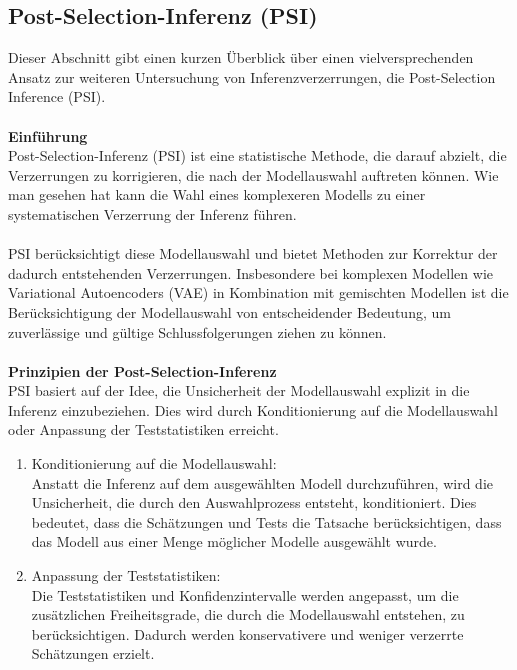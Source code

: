 \documentclass[%
thesis=student,%
coverpage=false,%
titlepage=false,%
headmarks=true, %
german,%
font=libertine, %
math=newpxtx, %
BCOR=5mm,%
coverBCOR=11mm%
]{tumbook}
\theoremstyle{break}
\begin{document}
\subsection{Post-Selection-Inferenz (PSI)}
Dieser Abschnitt gibt einen kurzen Überblick über einen vielversprechenden Ansatz zur weiteren Untersuchung von Inferenzverzerrungen, die Post-Selection Inference (PSI).\\
\\
\textbf{Einführung}\\
Post-Selection-Inferenz (PSI) ist eine statistische Methode, die darauf abzielt, die Verzerrungen zu korrigieren, die nach der Modellauswahl auftreten können. Wie man gesehen hat kann die Wahl eines komplexeren Modells zu einer systematischen Verzerrung der Inferenz führen.\\
\\
PSI berücksichtigt diese Modellauswahl und bietet Methoden zur Korrektur der dadurch entstehenden Verzerrungen. Insbesondere bei komplexen Modellen wie Variational Autoencoders (VAE) in Kombination mit gemischten Modellen ist die Berücksichtigung der Modellauswahl von entscheidender Bedeutung, um zuverlässige und gültige Schlussfolgerungen ziehen zu können.\\
\\
\textbf{Prinzipien der Post-Selection-Inferenz}\\
PSI basiert auf der Idee, die Unsicherheit der Modellauswahl explizit in die Inferenz einzubeziehen. Dies wird durch Konditionierung auf die Modellauswahl oder Anpassung der Teststatistiken erreicht.\\
\begin{enumerate}
\item{Konditionierung auf die Modellauswahl:}\\
Anstatt die Inferenz auf dem ausgewählten Modell durchzuführen, wird die Unsicherheit, die durch den Auswahlprozess entsteht, konditioniert. Dies bedeutet, dass die Schätzungen und Tests die Tatsache berücksichtigen, dass das Modell aus einer Menge möglicher Modelle ausgewählt wurde.\\
\item{Anpassung der Teststatistiken:}\\
Die Teststatistiken und Konfidenzintervalle werden angepasst, um die zusätzlichen Freiheitsgrade, die durch die Modellauswahl entstehen, zu berücksichtigen. Dadurch werden konservativere und weniger verzerrte Schätzungen erzielt.\\
\end{enumerate}
\end{document}
